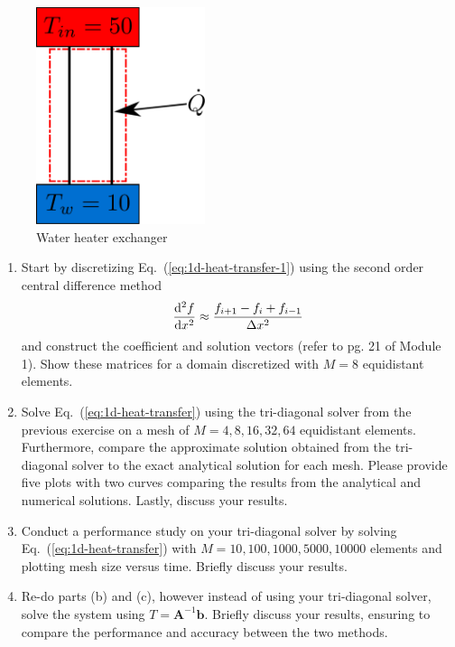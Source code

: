 \documentclass[12pt]{article}
\begin{document}
\begin{figure}[H]
    \includegraphics[height=2.5in]{../media/control-volume}
    \caption{Water heater exchanger}
    \label{fig:control-volume}
\end{figure}

\begin{enumerate}[label=(\alph*)]
    \item Start by discretizing Eq.~(\ref{eq:1d-heat-transfer-1}) using the
        second order central difference method
        \begin{equation}
            \dv[2]{f}{x} \approx
                    \frac{f_{i+1} - f_{i} + f_{i-1}}{\Delta x^{2}}
        \end{equation}
        and construct the coefficient and solution vectors (refer to pg. 21
        of Module 1). Show these matrices for a domain discretized with
        $M=8$ equidistant elements.    

    \item Solve Eq.~(\ref{eq:1d-heat-transfer}) using the tri-diagonal
        solver from the previous exercise on a mesh of $M=4, 8, 16, 32, 64$
        equidistant elements. Furthermore, compare the approximate solution
        obtained from the tri-diagonal solver to the exact analytical
        solution for each mesh. Please provide five plots with two curves
        comparing the results from the analytical and numerical solutions.
        Lastly, discuss your results.

    \item Conduct a performance study on your tri-diagonal solver by
        solving Eq.~(\ref{eq:1d-heat-transfer}) with $M=10, 100, 1000,
        5000, 10000$ elements and plotting mesh size versus time. Briefly
        discuss your results.

    \item Re-do parts (b) and (c), however instead of using your
        tri-diagonal solver, solve the system using 
        $T=\mathbf{A}^{-1}\mathbf{b}$. Briefly discuss your results,
        ensuring to compare the performance and accuracy between the two
        methods.
\end{enumerate}

    
\end{document}
